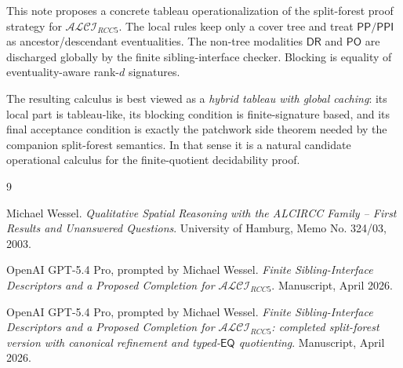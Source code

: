 \documentclass[11pt]{article}
\theoremstyle{remark}
\newcommand{\DR}{\mathsf{DR}}
\newcommand{\PO}{\mathsf{PO}}
\newcommand{\PP}{\mathsf{PP}}
\newcommand{\PPI}{\mathsf{PPI}}
\newcommand{\EQ}{\mathsf{EQ}}
\begin{document}
This note proposes a concrete tableau operationalization of the split-forest proof strategy for $\mathcal{ALCI}_{RCC5}$. The local rules keep only a cover tree and treat $\PP/\PPI$ as ancestor/descendant eventualities. The non-tree modalities $\DR$ and $\PO$ are discharged globally by the finite sibling-interface checker. Blocking is equality of eventuality-aware rank-$d$ signatures.

The resulting calculus is best viewed as a \emph{hybrid tableau with global caching}: its local part is tableau-like, its blocking condition is finite-signature based, and its final acceptance condition is exactly the patchwork side theorem needed by the companion split-forest semantics. In that sense it is a natural candidate operational calculus for the finite-quotient decidability proof.

\begin{thebibliography}{9}

Michael Wessel.
\newblock \emph{Qualitative Spatial Reasoning with the ALCIRCC Family -- First Results and Unanswered Questions}.
\newblock University of Hamburg, Memo No. 324/03, 2003.

OpenAI GPT-5.4 Pro, prompted by Michael Wessel.
\newblock \emph{Finite Sibling-Interface Descriptors and a Proposed Completion for $\mathcal{ALCI}_{RCC5}$}.
\newblock Manuscript, April 2026.

OpenAI GPT-5.4 Pro, prompted by Michael Wessel.
\newblock \emph{Finite Sibling-Interface Descriptors and a Proposed Completion for $\mathcal{ALCI}_{RCC5}$: completed split-forest version with canonical refinement and typed-$\EQ$ quotienting}.
\newblock Manuscript, April 2026.

\end{thebibliography}
\end{document}
